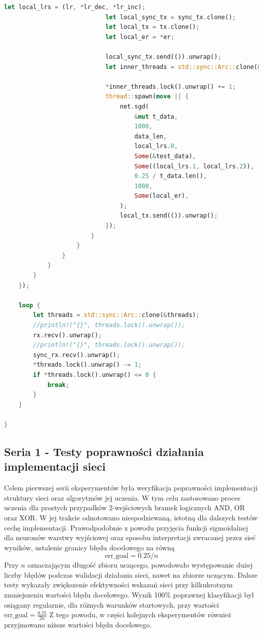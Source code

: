 \documentclass[12pt,twoside]{article}
\begin{document}
\begin{lstlisting}[language=Rust,caption=Przykładowy skrypt eksperymentalny,label={lst:mpsc}]
                            let local_lrs = (lr, *lr_dec, *lr_inc);
                            let local_sync_tx = sync_tx.clone();
                            let local_tx = tx.clone();
                            let local_er = *er;

                            local_sync_tx.send(()).unwrap();
                            let inner_threads = std::sync::Arc::clone(&tmp_threads);

                            *inner_threads.lock().unwrap() += 1;
                            thread::spawn(move || {
                                net.sgd(
                                    &mut t_data,
                                    1000,
                                    data_len,
                                    local_lrs.0,
                                    Some(&test_data),
                                    Some((local_lrs.1, local_lrs.2)),
                                    0.25 / t_data.len(),
                                    1000,
                                    Some(local_er),
                                );
                                local_tx.send(()).unwrap();
                            });
                        }
                    }
                }
            }
        }
    });

    loop {
        let threads = std::sync::Arc::clone(&threads);
        //println!("{}", threads.lock().unwrap());
        rx.recv().unwrap();
        //println!("{}", threads.lock().unwrap());
        sync_rx.recv().unwrap();
        *threads.lock().unwrap() -= 1;
        if *threads.lock().unwrap() <= 0 {
            break;
        }
    }

}
\end{lstlisting}

\subsection{Seria 1 - Testy poprawności działania implementacji sieci}
Celem pierwszej serii eksperymentów była weryfikacja poprawności implementacji struktury sieci oraz algorytmów jej uczenia.
W tym celu zastosowano proces uczenia dla prostych przypadków 2-wejściowych bramek logicznych AND, OR oraz XOR.
W jej trakcie odnotowano niespodziewaną, istotną dla dalszych testów cechę implementacji.
Prawodpodobnie z powodu przyjęcia funkcji sigmoidalnej dla neuronów warstwy wyjściowej oraz sposobu interpretacji zwracanej przez sieć wyników, ustalenie granicy błędu docelowego na równą
\begin{equation*}
    \text{err\_goal} = 0.25 / n
\end{equation*}
Przy $n$ oznaczającym długość zbioru uczącego, powodowało występowanie dużej liczby błędów podczas walidacji działania sieci, nawet na zbiorze uczącym.
Dalsze testy wykazały zwiększenie efektywności wskazań sieci przy kilkukrotnym zmniejszeniu wartości błędu docelowego.
Wynik 100\% poprawnej klasyfikacji był osiągany regularnie, dla różnych warunków startowych, przy wartości $\text{err\_goal} = \frac{0.25}{2n}$
Z tego powodu, w części kolejnych eksperymentów również przyjmowano niższe wartości błędu docelowego.
\end{document}
